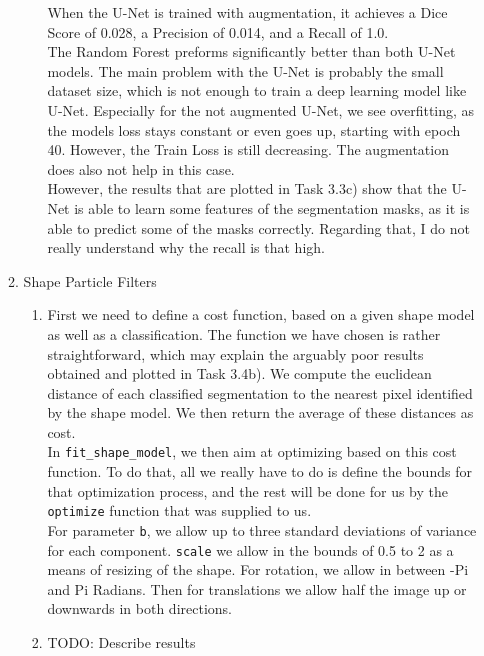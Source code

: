 \documentclass[
    a4paper,
    12pt,
    parskip=half,
]{scrarticle}
\begin{document}
\begin{enumerate}
\begin{enumerate}[label=\theenumi.\arabic*.]
\begin{enumerate}[label=\alph*)]
            When the U-Net is trained with augmentation, it achieves a Dice Score of 0.028, a Precision of 0.014, and a Recall of 1.0.
            \\
            The Random Forest preforms significantly better than both U-Net models.
            The main problem with the U-Net is probably the small dataset size, which is not enough to train a deep learning model like U-Net.
            Especially for the not augmented U-Net, we see overfitting, as the models loss stays constant or even goes up, starting with epoch 40.
            However, the Train Loss is still decreasing.
            The augmentation does also not help in this case.
            \\
            However, the results that are plotted in Task 3.3c) show that the U-Net is able to learn some features of the segmentation masks, as it is able to predict some of the masks correctly.
            Regarding that, I do not really understand why the recall is that high.
        \end{enumerate}
        \item Shape Particle Filters
        \begin{enumerate}[label=\alph*)]
            \item First we need to define a cost function, based on a given shape model as well as a classification. The function we have chosen is rather straightforward, which may explain the arguably poor results obtained and plotted in Task 3.4b). We compute the euclidean distance of each classified segmentation to the nearest pixel identified by the shape model. We then return the average of these distances as cost.\\
            In \texttt{fit\_shape\_model}, we then aim at optimizing based on this cost function. To do that, all we really have to do is define the bounds for that optimization process, and the rest will be done for us by the \texttt{optimize} function that was supplied to us.\\
            For parameter \texttt{b}, we allow up to three standard deviations of variance for each component. \texttt{scale} we allow in the bounds of 0.5 to 2 as a means of resizing of the shape.  For rotation, we allow in between -Pi and Pi Radians. Then for translations we allow half the image up or downwards in both directions.
            \item TODO: Describe results
        \end{enumerate}
    \end{enumerate}
\end{enumerate}
\end{document}
